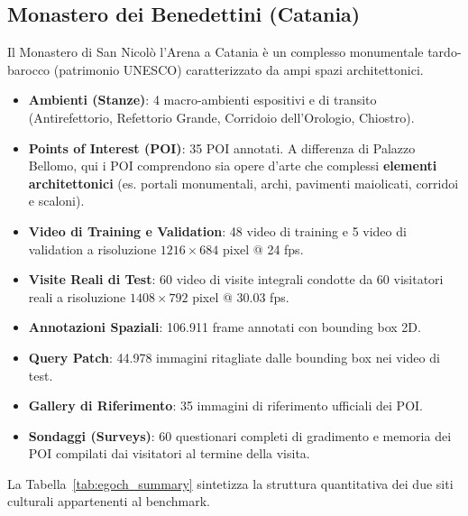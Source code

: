 \documentclass[a4paper,12pt]{report}
\begin{document}
\subsection{Monastero dei Benedettini (Catania)}
Il Monastero di San Nicolò l'Arena a Catania è un complesso monumentale tardo-barocco (patrimonio UNESCO) caratterizzato da ampi spazi architettonici.
\begin{itemize}
    \item \textbf{Ambienti (Stanze)}: 4 macro-ambienti espositivi e di transito (Antirefettorio, Refettorio Grande, Corridoio dell'Orologio, Chiostro).
    \item \textbf{Points of Interest (POI)}: 35 POI annotati. A differenza di Palazzo Bellomo, qui i POI comprendono sia opere d'arte che complessi \textbf{elementi architettonici} (es. portali monumentali, archi, pavimenti maiolicati, corridoi e scaloni).
    \item \textbf{Video di Training e Validation}: 48 video di training e 5 video di validation a risoluzione $1216 \times 684$ pixel @ 24 fps.
    \item \textbf{Visite Reali di Test}: 60 video di visite integrali condotte da 60 visitatori reali a risoluzione $1408 \times 792$ pixel @ 30.03 fps.
    \item \textbf{Annotazioni Spaziali}: 106.911 frame annotati con bounding box 2D.
    \item \textbf{Query Patch}: 44.978 immagini ritagliate dalle bounding box nei video di test.
    \item \textbf{Gallery di Riferimento}: 35 immagini di riferimento ufficiali dei POI.
    \item \textbf{Sondaggi (Surveys)}: 60 questionari completi di gradimento e memoria dei POI compilati dai visitatori al termine della visita.
\end{itemize}

La Tabella~\ref{tab:egoch_summary} sintetizza la struttura quantitativa dei due siti culturali appartenenti al benchmark.
\end{document}
